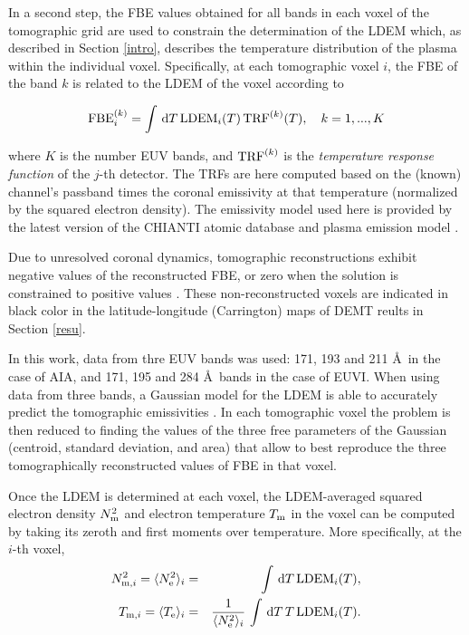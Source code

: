 \documentclass[namedreferences]{solarphysics}
\newcommand{\LDEM}{{\rm LDEM}}
\newcommand{\FBE}{{\rm FBE}}
\newcommand{\TRF}{{\rm TRF}}
\newcommand{\Te}{T_{\rm e}}
\newcommand{\Tm}{T_{\rm m}}
\newcommand{\Tmi}{T_{{\rm m},i}}
\newcommand{\Ne}{N_{\rm e}}
\newcommand{\Nm}{N_{\rm m}}
\newcommand{\Nsqmi}{N^2_{{\rm m},i}}
\begin{document}
\begin{article}
{In a second step, the FBE values obtained for all bands in each voxel {of the tomographic grid are used to constrain the determination of the LDEM which, as described in Section \ref{intro}, describes the temperature distribution of the plasma within the individual voxel.} Specifically, at each tomographic voxel $i$, the FBE of the band $k$ is related to the LDEM of the voxel according to}

\begin{equation}\label{fbeldem}
\FBE_i^{(k)}  = \int\,\textrm{d}T\,\LDEM_i(T)\,{\TRF}^{(k)}(T), \ \ \ {k=1,...,K}
\end{equation}

\noindent
{where $K$ is the number EUV bands, and $\TRF^{(k)}$ is the \emph{temperature response function} of the $j$-th detector. The TRFs are here computed based on the (known) channel’s passband times the coronal emissivity at that temperature (normalized by the squared electron density). The emissivity model used here is provided by the latest version of the CHIANTI atomic database and plasma emission model \citep{delzanna_2015,landi_2013}.}

Due to unresolved coronal dynamics, tomographic reconstructions exhibit negative values of the reconstructed FBE, or zero when the solution is constrained to positive values \citep{frazin_2000,frazin_2009}. These non-reconstructed voxels are indicated {in black color in the latitude-longitude (Carrington) maps of DEMT} reults in Section \ref{resu}.

{In this work,} data from thre EUV bands was {used:} 171, 193 and 211 \AA \ in {the} case of AIA, and 171, 195 and 284 \AA \ bands in {the} case of EUVI. When using data from {three bands}, a Gaussian model for the LDEM is able to accurately predict the tomographic emissivities \citep{frazin_2009,nuevo_2015}. In each tomographic voxel the problem is then reduced to finding the values of the three free parameters of the Gaussian (centroid, standard deviation, and area) that allow to best reproduce the three tomographically reconstructed values of FBE in that voxel.

Once the LDEM is determined at each voxel, {the LDEM-averaged squared electron density $\Nm^2$ and electron temperature $\Tm$} in the voxel can be computed by taking its zeroth and first moments over temperature. More specifically, at the $i$-th voxel,
{
\begin{eqnarray}\label{momento1}
 \Nsqmi = \langle \Ne^2 \rangle_i &=& \int\,\textrm{d}T\,\LDEM_i(T),\label{Ne} \\ 
\label{momento2}
 \Tmi  = \langle \Te \rangle_i &=& \frac{1}{\langle \Ne^2 \rangle_i}\,\int\,\textrm{d}T\,T\,\LDEM_i(T).\label{Tm} 
\end{eqnarray}
}


\end{article}
\end{document}
